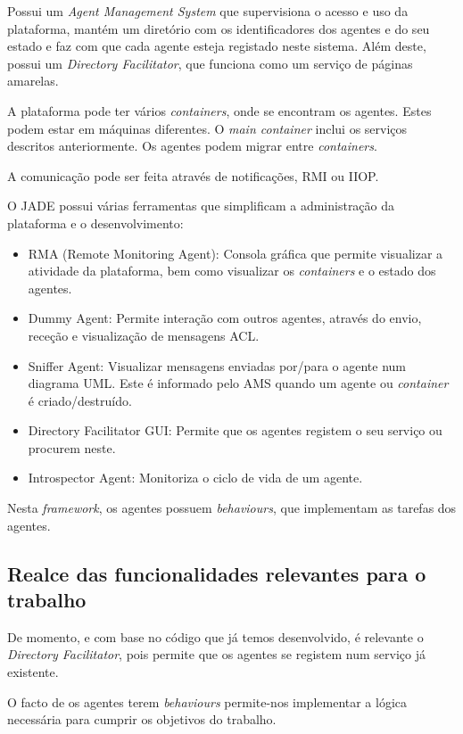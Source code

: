 \documentclass[a4paper]{article}
\begin{document}
Possui um \textit{Agent Management System} que supervisiona o acesso e uso da plataforma, mantém um diretório com os identificadores dos agentes e do seu estado e faz com que cada agente esteja registado neste sistema. Além deste, possui um \textit{Directory Facilitator}, que funciona como um serviço de páginas amarelas.

A plataforma pode ter vários \textit{containers}, onde se encontram os agentes. Estes podem estar em máquinas diferentes. O \textit{main container} inclui os serviços descritos anteriormente. Os agentes podem migrar entre \textit{containers}.

A comunicação pode ser feita através de notificações, RMI ou IIOP. 

O JADE possui várias ferramentas que simplificam a administração da plataforma e o desenvolvimento:

\begin{itemize}
\item RMA (Remote Monitoring Agent): Consola gráfica que permite visualizar a atividade da plataforma, bem como visualizar os \textit{containers} e o estado dos agentes.
\item Dummy Agent: Permite interação com outros agentes, através do envio, receção e visualização de mensagens ACL.
\item Sniffer Agent: Visualizar mensagens enviadas por/para o agente num diagrama UML. Este é informado pelo AMS quando um agente ou \textit{container} é criado/destruído.
\item Directory Facilitator GUI: Permite que os agentes registem o seu serviço ou procurem neste.
\item Introspector Agent: Monitoriza o ciclo de vida de um agente.
\end{itemize}

Nesta \textit{framework}, os agentes possuem \textit{behaviours}, que implementam as tarefas dos agentes.

\subsection{Realce das funcionalidades relevantes para o trabalho} 

De momento, e com base no código que já temos desenvolvido, é relevante o \textit{Directory Facilitator}, pois permite que os agentes se registem num serviço já existente.

O facto de os agentes terem \textit{behaviours} permite-nos implementar a lógica necessária para cumprir os objetivos do trabalho.
\end{document}
